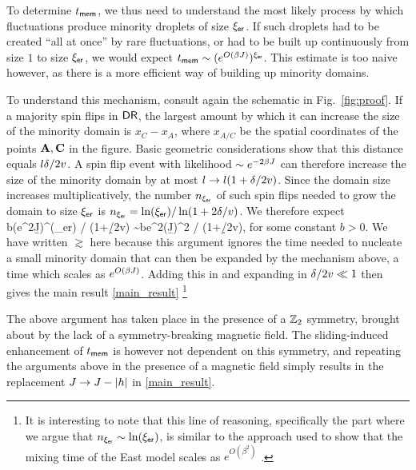 \documentclass[prl,aps,twocolumn,groupedaddress,superscriptaddress,preprintnumbers,nobibnotes]{revtex4-2}
\newcommand{\tmem}{{t_{\sf mem}}}
\newcommand{\ler}{{\xi_{\sf er}}} %
\newcommand{\dr}{{\sfD \sfR}}
\begin{document}
	To determine $\tmem$, we thus need to understand the most likely process by which fluctuations produce minority droplets of size $\ler$. If such droplets had to be created ``all at once'' by rare fluctuations, or had to be built up continuously from size $1$ to size $\ler$, we would expect $\tmem \sim (e^{O(\b J)})^\ler$. This estimate is too naive however, as there is a more efficient way of building up minority domains. 
	
	To understand this mechanism, consult again the schematic in Fig.~\ref{fig:proof}. If a majority spin flips in $\dr$, the largest amount by which it can increase the size of the minority domain is $x_C - x_A$, where $x_{A/C}$ be the spatial coordinates of the points $\mathbf{A},\mathbf{C}$ in the figure. Basic geometric considerations show \cite{code} that this distance equals $l\delta /2v$. A spin flip event with likelihood $\sim e^{-2\beta J}$ can therefore increase the size of the minority domain by at most $l \rightarrow l(1+\delta /2v)$. Since the domain size increases multiplicatively, the number $n_\ler$ of such spin flips needed to grow the domain to size $\ler$ is $n_\ler = \ln(\ler) / \ln(1+2\d/v)$. We therefore expect 
	\be \tmem \gtrsim b(e^{2\b J})^{\ln (\ler) / \ln(1+\d/2v)} \sim be^{2(\b J)^2 / \ln(1+\d /2v)},\ee 
	for some constant $b>0$. We have written $\gtrsim$ here because this argument ignores the time needed to nucleate a small minority domain that can then be expanded by the mechanism above, a time which scales as $e^{O(\beta J)}$. Adding this in and expanding in $\delta /2v \ll 1$ then gives the main result \eqref{main_result} \footnote{It is interesting to note that this line of reasoning, specifically the part where we argue that $n_\ler \sim \ln(\ler)$, is similar to the approach used to show that the mixing time of the East model scales as $e^{O(\beta^2)}$ \cite{garrahan2011kinetically}.} 
		
	The above argument has taken place in the presence of a $\mathbb{Z}_2$ symmetry, brought about by the lack of a symmetry-breaking magnetic field. The sliding-induced enhancement of $\tmem$ is however not dependent on this symmetry, and repeating the arguments above in the presence of a magnetic field simply results in the replacement $J \rightarrow J - |h|$ in \eqref{main_result}. 
\end{document}

